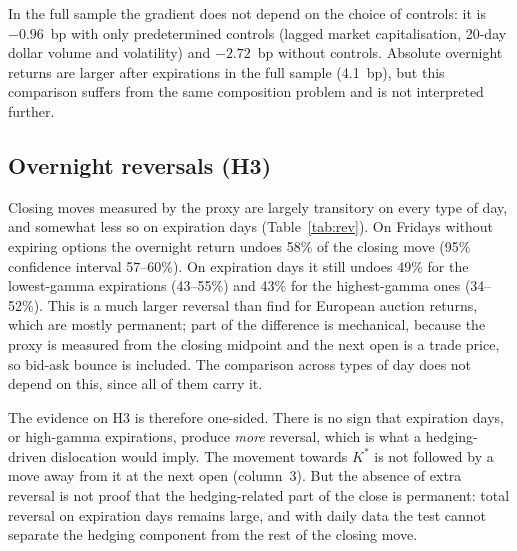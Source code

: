 \documentclass[11pt,a4paper]{article}
\newcommand{\Kstar}{K^{*}}
\begin{document}
In the full sample the gradient does not depend on the choice of controls: it is $-0.96$~bp with only predetermined controls (lagged market capitalisation, 20-day dollar volume and volatility) and $-2.72$~bp without controls. Absolute overnight returns are larger after expirations in the full sample (4.1~bp), but this comparison suffers from the same composition problem and is not interpreted further.

\subsection{Overnight reversals (H3)}

Closing moves measured by the proxy are largely transitory on every type of day, and somewhat less so on expiration days (Table~\ref{tab:rev}). On Fridays without expiring options the overnight return undoes 58\% of the closing move (95\% confidence interval 57--60\%). On expiration days it still undoes 49\% for the lowest-gamma expirations (43--55\%) and 43\% for the highest-gamma ones (34--52\%). This is a much larger reversal than \citet{ComertonFordeRindi2022} find for European auction returns, which are mostly permanent; part of the difference is mechanical, because the proxy is measured from the closing midpoint and the next open is a trade price, so bid-ask bounce is included. The comparison across types of day does not depend on this, since all of them carry it.

The evidence on H3 is therefore one-sided. There is no sign that expiration days, or high-gamma expirations, produce \emph{more} reversal, which is what a hedging-driven dislocation would imply. The movement towards $\Kstar$ is not followed by a move away from it at the next open (column~3). But the absence of extra reversal is not proof that the hedging-related part of the close is permanent: total reversal on expiration days remains large, and with daily data the test cannot separate the hedging component from the rest of the closing move.
\end{document}
